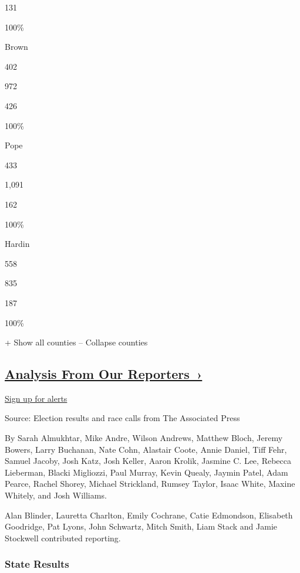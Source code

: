 131

100\%

Brown

402

972

426

100\%

Pope

433

1,091

162

100\%

Hardin

558

835

187

100\%

+ Show all counties -- Collapse counties

\hypertarget{analysis-from-our-reporters-}{%
\subsection{\texorpdfstring{\href{https://www.nytimes.com/interactive/2018/11/06/us/elections/live-midterm-election-analysis-updates.html}{Analysis
From Our
Reporters~›}}{Analysis From Our Reporters~›}}\label{analysis-from-our-reporters-}}

\protect\hyperlink{}{Sign up for alerts}

Source: Election results and race calls from The Associated Press

By Sarah Almukhtar, Mike Andre, Wilson Andrews, Matthew Bloch, Jeremy
Bowers, Larry Buchanan, Nate Cohn, Alastair Coote, Annie Daniel, Tiff
Fehr, Samuel Jacoby, Josh Katz, Josh Keller, Aaron Krolik, Jasmine C.
Lee, Rebecca Lieberman, Blacki Migliozzi, Paul Murray, Kevin Quealy,
Jaymin Patel, Adam Pearce, Rachel Shorey, Michael Strickland, Rumsey
Taylor, Isaac White, Maxine Whitely, and Josh Williams.

Alan Blinder, Lauretta Charlton, Emily Cochrane, Catie Edmondson,
Elisabeth Goodridge, Pat Lyons, John Schwartz, Mitch Smith, Liam Stack
and Jamie Stockwell contributed reporting.

\hypertarget{state-results}{%
\subsubsection{State Results}\label{state-results}}

